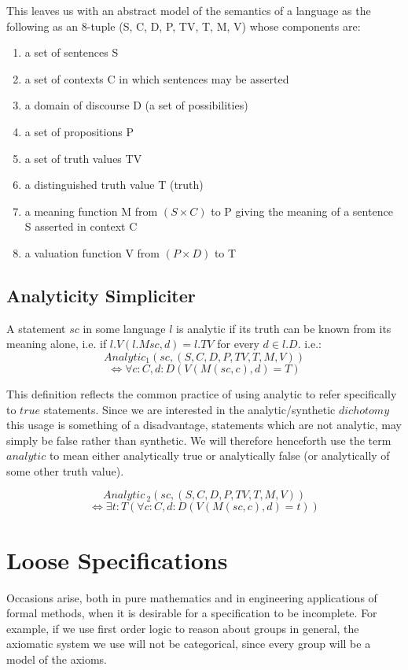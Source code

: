 \documentclass{rbjk}
\begin{document}
\begin{article}
This leaves us with an abstract model of the semantics of a language as the following as an 8-tuple (S, C, D, P, TV, T, M, V) whose components are:

\begin{enumerate}
\item a set of sentences S
\item a set of contexts C in which sentences may be asserted 
\item a domain of discourse D (a set of possibilities)
\item a set of propositions P
\item a set of truth values TV
\item a distinguished truth value T (truth)
\item a meaning function M from $(S \times C)$ to P giving the meaning of a sentence S asserted in context C
\item a valuation function V from $(P \times D)$ to T
\end{enumerate}

\subsection{Analyticity Simpliciter}

A statement $sc$ in some language $l$ is analytic if its truth can be known from its meaning alone, i.e. if $l.V(l.M sc, d) = l.TV$ for every $d \in l.D$.
i.e.:
	\[ Analytic_1(sc, (S,C,D,P,TV,T,M,V)) \]
	\[ \Leftrightarrow \forall c:C,d:D (V(M(sc, c), d) = T) \]

This definition reflects the common practice of using analytic to refer specifically to $true$ statements.
Since we are interested in the analytic/synthetic $dichotomy$ this usage is something of a disadvantage, statements which are not analytic, may simply be false rather than synthetic.
We will therefore henceforth use the term $analytic$ to mean either analytically true or analytically false (or analytically of some other truth value).

	\[ Analytic_{\ 2}(sc, (S,C,D,P,TV,T,M,V)) \]
	\[\Leftrightarrow \exists t:T(\forall c:C,d:D (V(M(sc, c), d) = t)) \]

\section{Loose Specifications}

Occasions arise, both in pure mathematics and in engineering applications of formal methods, when it is desirable for a specification to be incomplete.
For example, if we use first order logic to reason about groups in general, the axiomatic system we use will not be categorical, since every group will be a model of the axioms.


\end{article}
\end{document}
